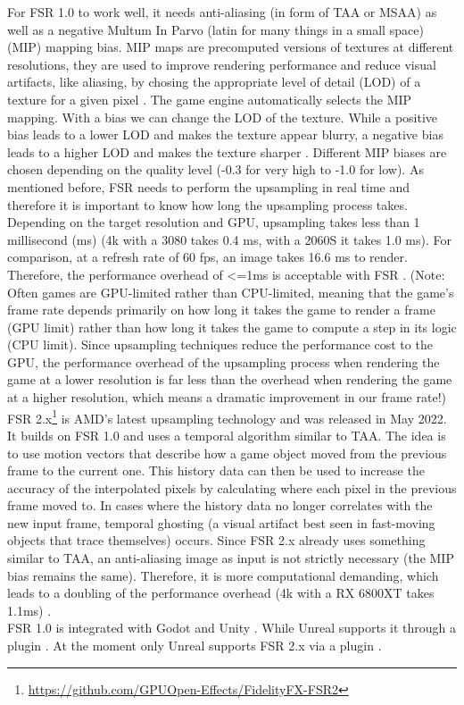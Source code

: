 \documentclass[letterpaper, 10 pt, conference]{ieeeconf}  %
\begin{document}
For FSR 1.0 to work well, it needs anti-aliasing (in form of TAA or MSAA) as well as a negative Multum In Parvo (latin for many things in a small space) (MIP) mapping bias.
MIP maps are precomputed versions of textures at different resolutions, they are used to improve rendering performance and reduce visual artifacts, like aliasing, by chosing the appropriate level of detail (LOD) of a texture for a given pixel \cite{MIP_map}.
The game engine automatically selects the MIP mapping. With a bias we can change the LOD of the texture. While a positive bias leads to a lower LOD and makes the texture appear blurry, a negative bias leads to a higher LOD and makes the texture sharper \cite{MIP_mapBias}.
Different MIP biases are chosen depending on the quality level (-0.3 for very high to -1.0 for low).
As mentioned before, FSR needs to perform the upsampling in real time and therefore it is important to know how long the upsampling process takes.
Depending on the target resolution and GPU, upsampling takes less than 1 millisecond (ms) (4k with a 3080 takes 0.4 ms, with a 2060S it takes 1.0 ms).
For comparison, at a refresh rate of 60 fps, an image takes 16.6 ms to render. Therefore, the performance overhead of <=1ms is acceptable with FSR \cite{fsr1.0}.
(Note: Often games are GPU-limited rather than CPU-limited, meaning that the game's frame rate depends primarily on how long it takes the game to render a frame (GPU limit) rather than how long it takes the game to compute a step in its logic (CPU limit).
Since upsampling techniques reduce the performance cost to the GPU, the performance overhead of the upsampling process when rendering the game at a lower resolution is far less than the overhead when rendering the game at a higher resolution, which means a dramatic improvement in our frame rate!)\\
FSR 2.x\footnote{\url{https://github.com/GPUOpen-Effects/FidelityFX-FSR2}} is AMD's latest upsampling technology and was released in May 2022.
It builds on FSR 1.0 and uses a temporal algorithm similar to TAA. The idea is to use motion vectors that describe how a game object moved from the previous frame to the current one.
This history data can then be used to increase the accuracy of the interpolated pixels by calculating where each pixel in the previous frame moved to.
In cases where the history data no longer correlates with the new input frame, temporal ghosting (a visual artifact best seen in fast-moving objects that trace themselves) occurs. 
Since FSR 2.x already uses something similar to TAA, an anti-aliasing image as input is not strictly necessary (the MIP bias remains the same).
Therefore, it is more computational demanding, which leads to a doubling of the performance overhead (4k with a RX 6800XT takes 1.1ms) \cite{fsr2.x}.\\
FSR 1.0 is integrated with Godot \cite{fsr1_godot} and Unity \cite{fsr1_unity}. While Unreal supports it through a plugin \cite{fsr1_unreal}.
At the moment only Unreal supports FSR 2.x via a plugin \cite{fsr2.x_unreal}.
\end{document}
